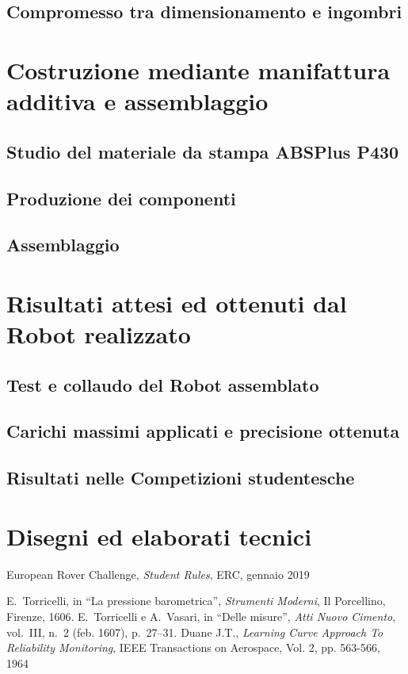 \documentclass[%
corpo=11pt,
twoside,
 stile=classica,
oldstyle,
greek,%
]{toptesi}
\begin{document}
	\section{Compromesso tra dimensionamento e ingombri}

\chapter{Costruzione mediante manifattura additiva e assemblaggio}
	\section{Studio del materiale da stampa ABSPlus P430}
	\section{Produzione dei componenti}
	\section{Assemblaggio}
\chapter{Risultati attesi ed ottenuti dal Robot realizzato}
	\section{Test e collaudo del Robot assemblato}
	\section{Carichi massimi applicati e precisione ottenuta}
	\section{Risultati nelle Competizioni studentesche }

\backmatter
\chapter{Disegni ed elaborati tecnici}







\begin{thebibliography}{9}
 European Rover Challenge, \emph{Student Rules}, ERC, gennaio 2019

 E.~Torricelli, in ``La pressione barometrica'', {\em Strumenti
        Moderni}, Il Porcellino, Firenze, 1606.
 E.~Torricelli e A.~Vasari, in ``Delle misure'', {\em Atti Nuovo
        Cimento}, vol.~III, n.~2 (feb. 1607), p.~27--31.
 Duane J.T., \emph{Learning Curve Approach To Reliability 
		Monitoring}, IEEE Transactions on Aerospace, Vol. 2, pp. 563-566, 1964
\end{thebibliography}
\end{document}
